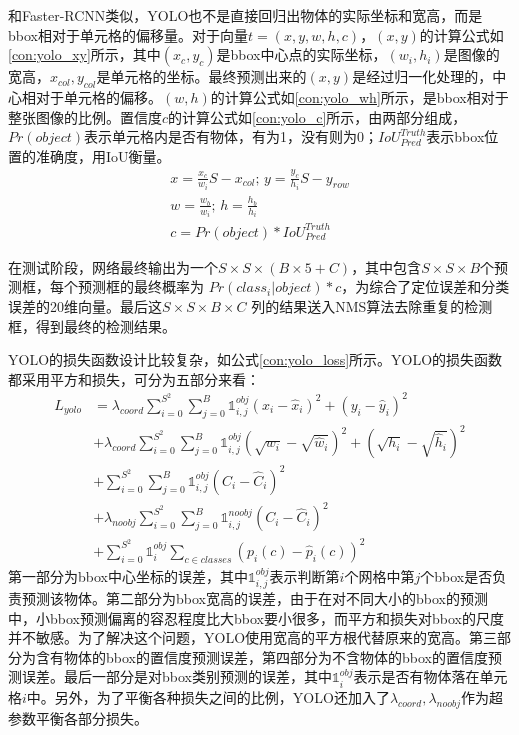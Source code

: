 和Faster-RCNN类似，YOLO也不是直接回归出物体的实际坐标和宽高，而是bbox相对于单元格的偏移量。对于向量$t=(x,y,w,h,c)$，$(x,y)$的计算公式如\ref{con:yolo_xy}所示，其中$(x_c,y_c)$是bbox中心点的实际坐标，$(w_i, h_i)$是图像的宽高，$x_{col}, y_{col}$是单元格的坐标。最终预测出来的$(x,y)$是经过归一化处理的，中心相对于单元格的偏移。$(w,h)$的计算公式如\ref{con:yolo_wh}所示，是bbox相对于整张图像的比例。置信度$c$的计算公式如\ref{con:yolo_c}所示，由两部分组成，$Pr(object)$表示单元格内是否有物体，有为1，没有则为0；$IoU^{Truth}_{Pred}$表示bbox位置的准确度，用IoU衡量。
\begin{gather}
x = \frac{x_c}{w_i}S - x_{col}; \, y = \frac{y_c}{h_i}S - y_{row} 
\label{con:yolo_xy}\\
w = \frac{w_b}{w_i}; \, h = \frac{h_b}{h_i}
\label{con:yolo_wh}\\
c = Pr(object)*IoU^{Truth}_{Pred}
\label{con:yolo_c}
\end{gather}

在测试阶段，网络最终输出为一个$S \times S \times (B \times 5 + C)$，其中包含$S \times S \times B$个预测框，每个预测框的最终概率为 $Pr(class_i|object) * c$，为综合了定位误差和分类误差的20维向量。最后这$S \times S \times B \times C$ 列的结果送入NMS算法去除重复的检测框，得到最终的检测结果。

YOLO的损失函数设计比较复杂，如公式\ref{con:yolo_loss}所示。YOLO的损失函数都采用平方和损失，可分为五部分来看：
\begin{equation}
\begin{split}
L_{yolo} &= \lambda_{coord} \sum^{S^2}_{i=0} \sum^{B}_{j=0} \mathds{1}^{obj}_{i,j} (x_i - \hat{x}_i)^2 + (y_i - \hat{y}_i)^2 \\
&+ \lambda_{coord} \sum^{S^2}_{i=0} \sum^{B}_{j=0} \mathds{1}^{obj}_{i,j} \left(\sqrt{w_i} - \sqrt{\hat{w}_i}\right)^2 + \left(\sqrt{h_i} - \sqrt{\hat{h}_i}\right)^2 \\
&+ \sum^{S^2}_{i=0} \sum^{B}_{j=0} \mathds{1}^{obj}_{i,j}\left(C_i -\hat{C}_i\right)^2\\
&+ \lambda_{noobj} \sum^{S^2}_{i=0} \sum^{B}_{j=0} \mathds{1}^{noobj}_{i,j}\left(C_i -\hat{C}_i\right)^2\\
&+ \sum^{S^2}_{i=0}\mathds{1}^{obj}_{i}\sum_{c \in classes} \left(p_i(c) - \hat{p}_i(c)\right)^2
\end{split}
\label{con:yolo_loss}
\end{equation}
第一部分为bbox中心坐标的误差，其中$\mathds{1}^{obj}_{i,j}$表示判断第$i$个网格中第$j$个bbox是否负责预测该物体。第二部分为bbox宽高的误差，由于在对不同大小的bbox的预测中，小bbox预测偏离的容忍程度比大bbox要小很多，而平方和损失对bbox的尺度并不敏感。为了解决这个问题，YOLO使用宽高的平方根代替原来的宽高。第三部分为含有物体的bbox的置信度预测误差，第四部分为不含物体的bbox的置信度预测误差。最后一部分是对bbox类别预测的误差，其中$\mathds{1}^{obj}_{i}$表示是否有物体落在单元格$i$中。另外，为了平衡各种损失之间的比例，YOLO还加入了$\lambda_{coord}, \lambda_{noobj}$作为超参数平衡各部分损失。

